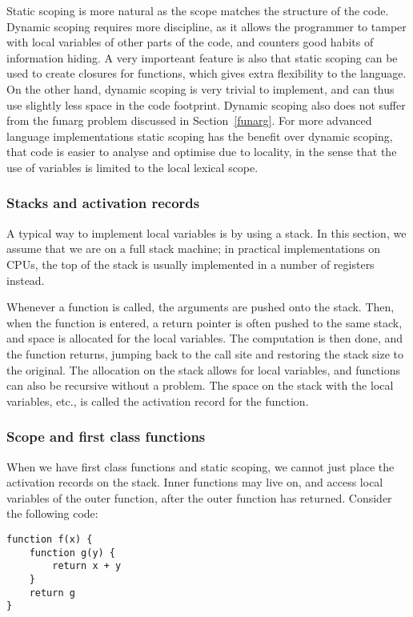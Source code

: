 \documentclass[11pt]{report}
\begin{document}
Static scoping is more natural as the scope matches the structure of the code. Dynamic scoping requires more discipline, as it allows the programmer to tamper with local variables of other parts of the code, and counters good habits of information hiding. A very importeant feature is also that static scoping can be used to create closures for functions, which gives extra flexibility to the language.
On the other hand, dynamic scoping is very trivial to implement, and can thus use slightly less space in the code footprint. 
Dynamic scoping also does not suffer from the funarg problem discussed in Section~\ref{funarg}.
For more advanced language implementations static scoping has the benefit over dynamic scoping, that code is easier to analyse and optimise due to locality, in the sense that the use of variables is limited to the local lexical scope.

\subsubsection{Stacks and activation records}
A typical way to implement local variables is by using a stack.
In this section, we assume that we are on a full stack machine; 
in practical implementations on CPUs, the top of the stack is usually implemented in a number of registers instead.

Whenever a function is called, the arguments are pushed onto the stack. Then, when the function is entered, a return pointer is often pushed to the same stack, and space is allocated for the local variables. The computation is then done, and the function returns, jumping back to the call site and restoring the stack size to the original.
The allocation on the stack allows for local variables, and functions can also be recursive without a problem. The space on the stack with the local variables, etc., is called the activation record for the function.

\subsubsection{Scope and first class functions}

When we have first class functions and static scoping, we cannot just place the activation records on the stack. Inner functions may live on, and access local variables of the outer function, after the outer function has returned. Consider the following code:
\begin{verbatim}
function f(x) {
    function g(y) {
        return x + y
    }
    return g
}
\end{verbatim}
\end{document}

